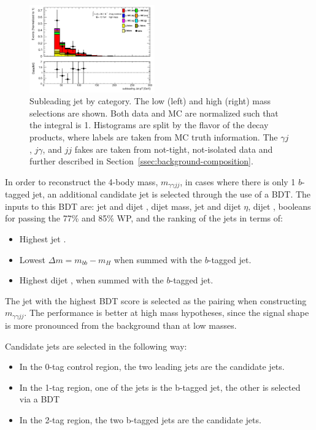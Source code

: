 \begin{figure}[p]
  \includegraphics[width=0.48\textwidth]{chapters/chapter5_yybb/images/data_MC_comparison/h_SR_h_2t_nominal_subleadingJet_pt.pdf}
  \caption[Subleading jet \pt by \btagging category]{Subleading jet \pt by \btagging category. The low (left) and high (right) mass selections are shown. Both data and MC are normalized such that the integral is 1. Histograms are split by the flavor of the \Hbb decay products, where labels are taken from \gls{MC} truth information. The $\gamma j$, $j\gamma$, and $jj$ fakes are taken from not-tight, not-isolated data and further described in Section~\ref{ssec:background-composition}.
  \label{fig:jet_s_pt}}
\end{figure}

In order to reconstruct the 4-body mass, $m_{\gamma\gamma jj}$, in cases where there is only 1 $b$-tagged jet, an additional candidate jet is selected through the use of a \gls{BDT}. The inputs to this \gls{BDT} are: jet and dijet \pt, dijet mass, jet and dijet $\eta$, dijet \Deta, booleans for passing the 77\% and 85\% \btagging WP, and the ranking of the jets in terms of:

\begin{itemize}
  \item Highest jet \pt.
  \item Lowest $\Delta m = m_{bb} - m_H$ when summed with the $b$-tagged jet.
  \item Highest dijet \pt, when summed with the $b$-tagged jet.
\end{itemize}

The jet with the highest \gls{BDT} score is selected as the pairing when constructing  $m_{\gamma\gamma jj}$. The performance is better at high mass hypotheses, since the signal shape is more pronounced from the background than at low masses. 

Candidate jets are selected in the following way:
\begin{itemize}
  \item In the 0-tag control region, the two leading jets are the candidate jets.
  \item In the 1-tag region, one of the jets is the b-tagged jet, the other is selected via a \gls{BDT}
  \item In the 2-tag region, the two b-tagged jets are the candidate jets.
\end{itemize}

